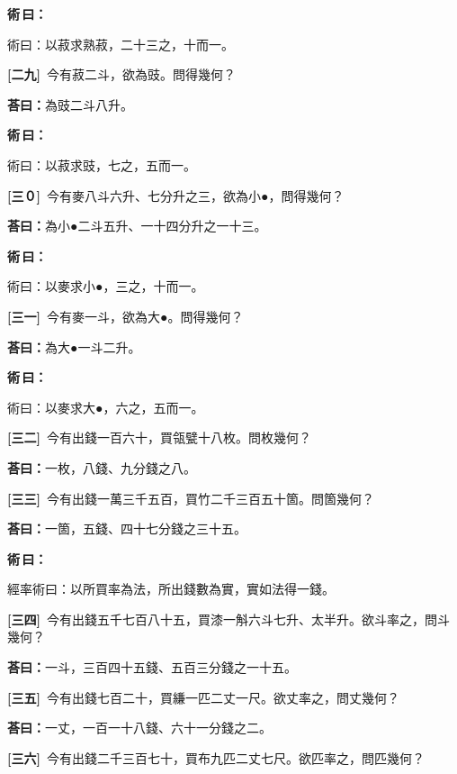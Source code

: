 \documentclass[11pt,a4paper]{article}
\newenvironment{method}{%
  \par\noindent\textcolor{methodcolor}{\textbf{術\,曰：}}%
  \ignorespaces
}{\par\vspace{0.5em}}
\newcommand{\problemnum}[1]{\textbf{[\ignorespaces#1\unskip]}}
\begin{document}
\begin{method}
術曰：以菽求熟菽，二十三之，十而一。
\end{method}

\noindent\problemnum{二九}\,
今有菽二斗，欲為豉。問得幾何？

\noindent\textcolor{answercolor}{\textbf{荅曰：}}為豉二斗八升。

\begin{method}
術曰：以菽求豉，七之，五而一。
\end{method}

\noindent\problemnum{三０}\,
今有麥八斗六升、七分升之三，欲為小●，問得幾何？

\noindent\textcolor{answercolor}{\textbf{荅曰：}}為小●二斗五升、一十四分升之一十三。

\begin{method}
術曰：以麥求小●，三之，十而一。
\end{method}

\noindent\problemnum{三一}\,
今有麥一斗，欲為大●。問得幾何？

\noindent\textcolor{answercolor}{\textbf{荅曰：}}為大●一斗二升。

\begin{method}
術曰：以麥求大●，六之，五而一。
\end{method}

\noindent\problemnum{三二}\,
今有出錢一百六十，買瓴甓十八枚。問枚幾何？

\noindent\textcolor{answercolor}{\textbf{荅曰：}}一枚，八錢、九分錢之八。

\noindent\problemnum{三三}\,
今有出錢一萬三千五百，買竹二千三百五十箇。問箇幾何？

\noindent\textcolor{answercolor}{\textbf{荅曰：}}一箇，五錢、四十七分錢之三十五。

\begin{method}
經率術曰：以所買率為法，所出錢數為實，實如法得一錢。
\end{method}

\noindent\problemnum{三四}\,
今有出錢五千七百八十五，買漆一斛六斗七升、太半升。欲斗率之，問斗幾何？

\noindent\textcolor{answercolor}{\textbf{荅曰：}}一斗，三百四十五錢、五百三分錢之一十五。

\noindent\problemnum{三五}\,
今有出錢七百二十，買縑一匹二丈一尺。欲丈率之，問丈幾何？

\noindent\textcolor{answercolor}{\textbf{荅曰：}}一丈，一百一十八錢、六十一分錢之二。

\noindent\problemnum{三六}\,
今有出錢二千三百七十，買布九匹二丈七尺。欲匹率之，問匹幾何？
\end{document}
